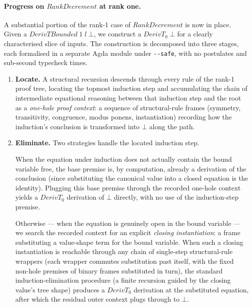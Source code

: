\documentclass[11pt]{article}
\begin{document}
\paragraph{Progress on $\mathit{RankDecrement}$ at rank one.}
A substantial portion of the rank-1 case of $\mathit{RankDecrement}$
is now in place.  Given a $\mathit{DerivTBounded}\;1\;l\;\bot$, we
construct a $\mathit{DerivT}_0\;\bot$ for a clearly characterised
slice of inputs.  The construction is decomposed into three stages,
each formalised in a separate Agda module under \verb|--safe|, with
no postulates and sub-second typecheck times.

\begin{enumerate}
  \item \textbf{Locate.}  A structural recursion descends through
        every rule of the rank-1 proof tree, locating the topmost
        induction step and accumulating the chain of intermediate
        equational reasoning between that induction step and the
        root as a \emph{one-hole proof context}: a sequence of
        structural-rule frames (symmetry, transitivity, congruence,
        modus ponens, instantiation) recording how the induction's
        conclusion is transformed into $\bot$ along the path.

  \item \textbf{Eliminate.}  Two strategies handle the located
        induction step.

        When the equation under induction does not actually contain
        the bound variable free, the base premise is, by computation,
        already a derivation of the conclusion (since substituting
        the canonical value into a closed equation is the identity).
        Plugging this base premise through the recorded one-hole
        context yields a $\mathit{DerivT}_0$ derivation of $\bot$
        directly, with no use of the induction-step premise.

        Otherwise --- when the equation is genuinely open in the
        bound variable --- we search the recorded context for an
        explicit \emph{closing instantiation}: a frame substituting
        a value-shape term for the bound variable.  When such a
        closing instantiation is reachable through any chain of
        single-step structural-rule wrappers (each wrapper
        commutes substitution past itself, with the fixed non-hole
        premises of binary frames substituted in turn), the standard
        induction-elimination procedure (a finite recursion guided
        by the closing value's tree shape) produces a
        $\mathit{DerivT}_0$ derivation at the substituted equation,
        after which the residual outer context plugs through to
        $\bot$.


\end{enumerate}
\end{document}
